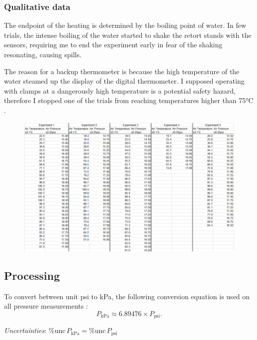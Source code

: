 \documentclass[a4paper,12pt]{article}
\newcommand{\relun}{\% \text{unc}\,}
\begin{document}
\subsubsection*{Qualitative data}
The endpoint of the heating is determined by the boiling point of water. In few trials, the intense boiling of the water started to shake the retort stands with the sensors, requiring me to end the experiment early in fear of the shaking resonating, causing spills.

The reason for a backup thermometer is because the high temperature of the water steamed up the display of the digital thermometer. I supposed operating with clamps at a dangerously high temperature is a potential safety hazard, therefore I stopped one of the trials from reaching temperatures higher than 75$\si{\celsius}$.

\begin{figure}[H]
    \centering
    \includegraphics[width=\textwidth]{assets/rawdata.png}
\end{figure}

\subsection{Processing}
To convert between unit psi to kPa, the following conversion equation is used on all pressure measurements \parencite{conver_units}:
\[
    P_{\text{kPa}} \approx 6.89476 \times P_{\text{psi}}.
\]

\textit{Uncertainties}: $\relun P_{\text{kPa}} = \relun P_{\text{psi}}$
\end{document}
